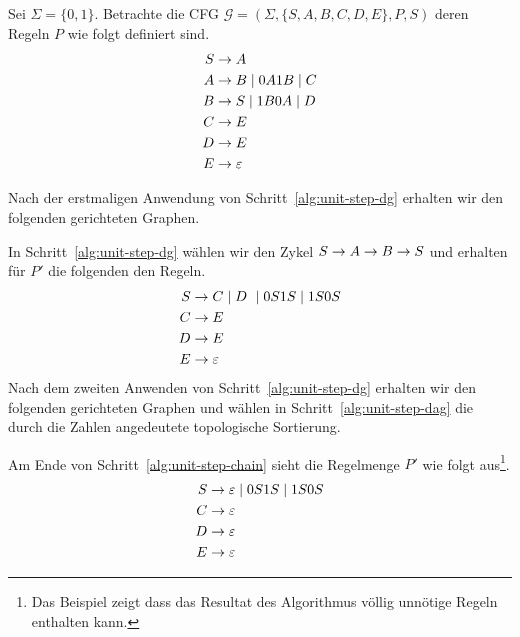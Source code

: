 \begin{Bsp}
	Sei $\Sigma=\{0,1\}$. Betrachte die \ac{CFG} $\mathcal{G} = (\Sigma, \{S,A,B,C,D,E\}, P, S)$
	deren Regeln $P$ wie folgt definiert sind.
	\begin{align*}
		S &\-> A\\
		A &\-> B \mid 0A1B \mid C\\
		B &\-> S \mid 1B0A \mid D\\
		C &\-> E\\
		D &\-> E\\
		E &\-> \varepsilon\\
	\end{align*}
	
	Nach der erstmaligen Anwendung von Schritt~\ref{alg:unit-step-dg} erhalten wir den folgenden gerichteten Graphen.
	\begin{center}
	\end{center}
	In Schritt~\ref{alg:unit-step-dg} wählen wir den Zykel $S \-> A \-> B \-> S$ und erhalten für $P'$ die folgenden den Regeln.
	\begin{align*}
		S &\-> C\mid D\ \mid 0S1S \mid 1S0S\\
		C &\-> E\\
		D &\-> E\\
		E &\-> \varepsilon\\
	\end{align*}
	Nach dem zweiten Anwenden von Schritt~\ref{alg:unit-step-dg} erhalten wir den folgenden gerichteten Graphen und wählen in Schritt~\ref{alg:unit-step-dag} die durch die Zahlen angedeutete topologische Sortierung.
	\begin{center}
	\end{center}
	Am Ende von Schritt~\ref{alg:unit-step-chain} sieht die Regelmenge $P'$ wie folgt aus\footnote{
		Das Beispiel zeigt dass das Resultat des Algorithmus völlig unnötige Regeln enthalten kann.
	}.
	\begin{align*}
		S &\-> \varepsilon \mid 0S1S \mid 1S0S\\
		C &\-> \varepsilon\\
		D &\-> \varepsilon\\
		E &\-> \varepsilon\\
	\end{align*}

\end{Bsp}




